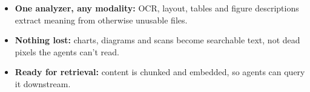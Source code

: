 \documentclass{beamer}
\begin{document}
\begin{frame}
\begin{center}
{%
}
\end{center}

\vspace{0.2cm}
{\footnotesize
\begin{itemize}
  \item \textbf{\color{earlblue}One analyzer, any modality:} OCR, layout, tables and figure descriptions extract meaning from otherwise unusable files.
  \item \textbf{\color{earlblue}Nothing lost:} charts, diagrams and scans become searchable text, not dead pixels the agents can't read.
  \item \textbf{\color{earlblue}Ready for retrieval:} content is chunked and embedded, so agents can query it downstream.
\end{itemize}
}
\vfill
\end{frame}

\end{document}
